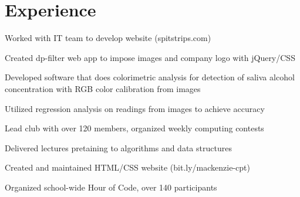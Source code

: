 \documentclass[]{deedy-resume-openfont}
\begin{document}
\hfill
\begin{minipage}[t]{0.66\textwidth} 


\section{Experience}

\vspace{\topsep}
\begin{tightemize}
\item Worked with IT team to develop website (spitstrips.com)
\item Created dp-filter web app to impose images and company logo with jQuery/CSS
\item Developed software that does colorimetric analysis for detection of saliva alcohol concentration with RGB color calibration from images
\item Utilized regression analysis on readings from images to achieve accuracy
\end{tightemize}
\sectionsep

\begin{tightemize}
\item Lead club with over 120 members, organized weekly computing contests
\item Delivered lectures pretaining to algorithms and data structures
\item Created and maintained HTML/CSS website (bit.ly/mackenzie-cpt)
\item Organized school-wide Hour of Code, over 140 participants
\end{tightemize}
\sectionsep

\sectionsep


\end{minipage}
\end{document}
